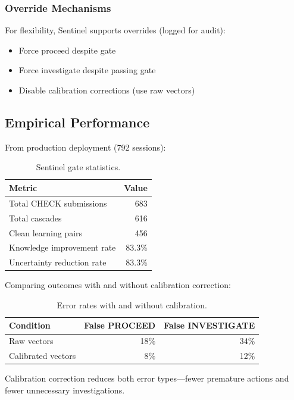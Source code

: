 \subsubsection{Override Mechanisms}

For flexibility, Sentinel supports overrides (logged for audit):
\begin{itemize}
    \item Force proceed despite gate
    \item Force investigate despite passing gate
    \item Disable calibration corrections (use raw vectors)
\end{itemize}

\subsection{Empirical Performance}

From production deployment (792 sessions):

\begin{table}[h]
\centering
\begin{tabular}{lr}
\toprule
\textbf{Metric} & \textbf{Value} \\
\midrule
Total CHECK submissions & 683 \\
Total cascades & 616 \\
Clean learning pairs & 456 \\
Knowledge improvement rate & 83.3\% \\
Uncertainty reduction rate & 83.3\% \\
\bottomrule
\end{tabular}
\caption{Sentinel gate statistics.}
\label{tab:gate-stats}
\end{table}

Comparing outcomes with and without calibration correction:

\begin{table}[h]
\centering
\begin{tabular}{lrr}
\toprule
\textbf{Condition} & \textbf{False PROCEED} & \textbf{False INVESTIGATE} \\
\midrule
Raw vectors & 18\% & 34\% \\
Calibrated vectors & 8\% & 12\% \\
\bottomrule
\end{tabular}
\caption{Error rates with and without calibration.}
\label{tab:error-rates}
\end{table}

Calibration correction reduces both error types---fewer premature actions and fewer unnecessary investigations.

